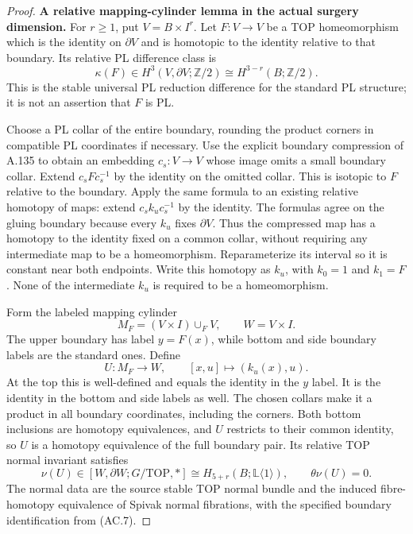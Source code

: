\begin{proof}
\textbf{A relative mapping-cylinder lemma in the actual surgery dimension.}
For $r\ge1$, put $V=B\times I^r$. Let $F:V\to V$ be a TOP
homeomorphism which is the identity on $\partial V$ and is homotopic
to the identity relative to that boundary. Its relative PL difference
class is
\[
 \kappa(F)\in H^3(V,\partial V;\mathbb Z/2)
                   \cong H^{3-r}(B;\mathbb Z/2).                   \tag{AC.6}
\]
This is the stable universal PL reduction difference for the standard
PL structure; it is not an assertion that $F$ is PL.

Choose a PL collar of the entire boundary, rounding the product corners
in compatible PL coordinates if necessary. Use the explicit boundary
compression of A.135 to obtain an embedding $c_s:V\to V$ whose image
omits a small boundary collar. Extend $c_sFc_s^{-1}$ by the identity
on the omitted collar. This is isotopic to $F$ relative to the boundary.
Apply the same formula to an existing relative homotopy of maps:
extend $c_sk_uc_s^{-1}$ by the identity. The formulas agree on the
gluing boundary because every $k_u$ fixes $\partial V$. Thus the
compressed map has a homotopy to the identity fixed on a common collar,
without requiring any intermediate map to be a homeomorphism.
Reparameterize its interval so it
is constant near both endpoints. Write this homotopy as $k_u$, with
$k_0=1$ and $k_1=F$. None of the intermediate $k_u$ is required to be
a homeomorphism.

Form the labeled mapping cylinder
\[
 M_F=(V\times I)\cup_F V,\qquad W=V\times I.
\]
The upper boundary has label $y=F(x)$, while bottom and side boundary
labels are the standard ones. Define
\[
 U:M_F\longrightarrow W,\qquad [x,u]\longmapsto(k_u(x),u).          \tag{AC.7}
\]
At the top this is well-defined and equals the identity in the $y$
label. It is the identity in the bottom and side labels as well.
The chosen collars make it a product in all boundary coordinates,
including the corners. Both bottom inclusions are homotopy
equivalences, and $U$ restricts to their common identity, so $U$ is a
homotopy equivalence of the full boundary pair. Its relative TOP normal
invariant satisfies
\[
 \nu(U)\in[W,\partial W;G/\mathrm{TOP},*]
       \cong H_{5+r}(B;\mathbb L\langle1\rangle),
 \qquad \theta\nu(U)=0.                                          \tag{AC.8}
\]
The normal data are the source stable TOP normal bundle and the
induced fibre-homotopy equivalence of Spivak normal fibrations, with
the specified boundary identification from (AC.7).


\end{proof}
